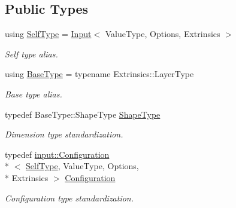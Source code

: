 \subsection*{Public Types}
\begin{DoxyCompactItemize}
\item 
using \hyperlink{classffnn_1_1layer_1_1_input_a8cdae3fa08b2953c6aa4c6e5eadccb48}{Self\-Type} = \hyperlink{classffnn_1_1layer_1_1_input}{Input}$<$ Value\-Type, Options, Extrinsics $>$
\begin{DoxyCompactList}\small\item\em Self type alias. \end{DoxyCompactList}\item 
using \hyperlink{classffnn_1_1layer_1_1_input_a260554aaf9a0bfddfc4a47b6acf0ecc0}{Base\-Type} = typename Extrinsics\-::\-Layer\-Type
\begin{DoxyCompactList}\small\item\em Base type alias. \end{DoxyCompactList}\item 
typedef Base\-Type\-::\-Shape\-Type \hyperlink{classffnn_1_1layer_1_1_input_ae8c4efd9d9e28b207f48836d0573be8b}{Shape\-Type}
\begin{DoxyCompactList}\small\item\em Dimension type standardization. \end{DoxyCompactList}\item 
typedef \hyperlink{classffnn_1_1layer_1_1input_1_1_configuration}{input\-::\-Configuration}\\*
$<$ \hyperlink{classffnn_1_1layer_1_1_input_a8cdae3fa08b2953c6aa4c6e5eadccb48}{Self\-Type}, Value\-Type, Options, \\*
Extrinsics $>$ \hyperlink{classffnn_1_1layer_1_1_input_ae847a51afe587ae67d9cb1de579d15aa}{Configuration}
\begin{DoxyCompactList}\small\item\em Configuration type standardization. \end{DoxyCompactList}\end{DoxyCompactItemize}
